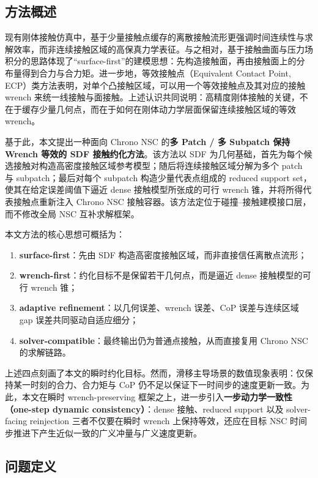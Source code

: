 \label{sec:method}

\subsection{方法概述}

现有刚体接触仿真中，基于少量接触点缓存的离散接触流形更强调时间连续性与求解效率，而非连续接触区域的高保真力学表征。与之相对，基于接触曲面与压力场积分的思路体现了“surface-first”的建模思想：先构造接触面，再由接触面上的分布量得到合力与合力矩。进一步地，等效接触点（Equivalent Contact Point, ECP）类方法表明，对单个凸接触区域，可以用一个等效接触点及其对应的接触 wrench 来统一线接触与面接触。上述认识共同说明：高精度刚体接触的关键，不在于缓存少量几何点，而在于如何在刚体动力学层面保留连续接触区域的等效 wrench。

基于此，本文提出一种面向 Chrono NSC 的\textbf{多 Patch / 多 Subpatch 保持 Wrench 等效的 SDF 接触约化方法}。该方法以 SDF 为几何基础，首先为每个候选接触对构造高密度接触区域参考模型；随后将连续接触区域分解为多个 patch 与 subpatch；最后对每个 subpatch 构造少量代表点组成的 reduced support set，使其在给定误差阈值下逼近 dense 接触模型所张成的可行 wrench 锥，并将所得代表接触点重新注入 Chrono NSC 接触容器。该方法定位于碰撞--接触建模接口层，而不修改全局 NSC 互补求解框架。

本文方法的核心思想可概括为：
\begin{enumerate}[label=(\arabic*)]
    \item \textbf{surface-first}：先由 SDF 构造高密度接触区域，而非直接信任离散点流形；
    \item \textbf{wrench-first}：约化目标不是保留若干几何点，而是逼近 dense 接触模型的可行 wrench 锥；
    \item \textbf{adaptive refinement}：以几何误差、wrench 误差、CoP 误差与连续区域 gap 误差共同驱动自适应细分；
    \item \textbf{solver-compatible}：最终输出仍为普通点接触，从而直接复用 Chrono NSC 的求解链路。
\end{enumerate}

上述四点刻画了本文的瞬时约化目标。然而，滑移主导场景的数值现象表明：仅保持某一时刻的合力、合力矩与 CoP 仍不足以保证下一时间步的速度更新一致。为此，本文在瞬时 wrench-preserving 框架之上，进一步引入\textbf{一步动力学一致性（one-step dynamic consistency）}：dense 接触、reduced support 以及 solver-facing reinjection 三者不仅要在瞬时 wrench 上保持等效，还应在目标 NSC 时间步推进下产生近似一致的广义冲量与广义速度更新。

\subsection{问题定义}

